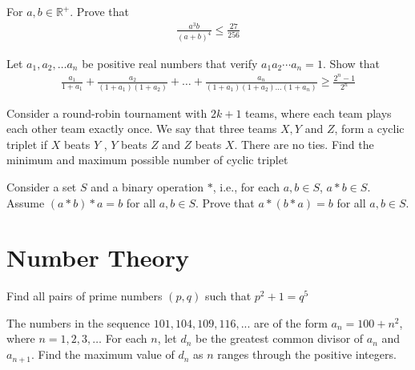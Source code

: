 \begin{problem}[Q][5][Pathfinder]
    For $a,b \in \mathbb{R}^+$. Prove that 
    \begin{align*}
        \frac{a^3b}{(a+b)^4} \leq \frac{27}{256}
    \end{align*}
\end{problem}

\begin{problem}
    Let $a_1,a_2,\ldots a_n$ be positive real numbers that verify $a_1a_2 \cdots a_n=1$. Show that 
    \begin{align*}
        \frac{a_1}{1+a_1}+\frac{a_2}{(1+a_1)(1+a_2)}+\ldots+\frac{a_n}{(1+a_1)(1+a_2) \ldots (1+a_n)} \geq \frac{2^n-1}{2^n}
    \end{align*}
\end{problem}

\begin{problem}
    Consider a round-robin tournament with $2k + 1$ teams, where each team plays each other team exactly once. We say that three teams $X, Y$ and $Z$, form a cyclic triplet if $X$ beats $Y$ , $Y$ beats $Z$ and $Z$ beats $X$. There are no ties. Find the minimum and maximum possible number of cyclic triplet
\end{problem}

\begin{problem}[A][4][Putnam 2001]
   Consider a set $S$ and a binary operation $*$, i.e., for each $a,b \in S$, $a*b \in S$. Assume $(a*b)*a = b$ for all $a,b \in S$. Prove that $a * (b * a) = b$ for all $a,b \in S$.
\end{problem}

\newpage
\thispagestyle{firstpageheader}
\section{Number Theory}

\begin{problem}[N][1]
    Find all pairs of prime numbers $(p,q)$ such that $p^2+1=q^5$
\end{problem}

\begin{problem}[N][4][AIME 1985]
    The numbers in the sequence $101, 104, 109,116, . . .$ are of the form $a_n = 100+n^2$, where $n = 1,2,3,\ldots$ For each $n$, let $d_n$ be the greatest common divisor of $a_n$ and $a_{n+1}$. Find the maximum value of $d_n$ as $n$ ranges through the positive integers.
\end{problem}


